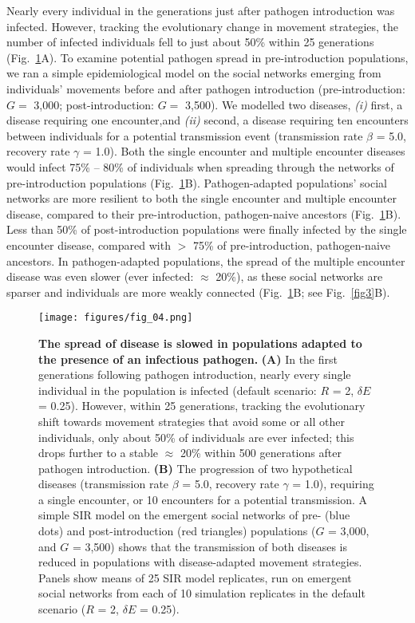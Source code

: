 Nearly every individual in the generations just after pathogen introduction was infected.
However, tracking the evolutionary change in movement strategies, the number of infected individuals fell to just about 50\% within 25 generations (Fig.~\ref{fig4}A).
To examine potential pathogen spread in pre-introduction populations, we ran a simple epidemiological model on the social networks emerging from individuals' movements before and after pathogen introduction (pre-introduction: $G =$ 3,000; post-introduction: $G =$ 3,500).
We modelled two diseases, \textit{(i)} first, a disease requiring one encounter,and \textit{(ii)} second, a disease requiring ten encounters between individuals for a potential transmission event (transmission rate $\beta$ = 5.0, recovery rate $\gamma$ = 1.0).
Both the single encounter and multiple encounter diseases would infect 75\% -- 80\% of individuals when spreading through the networks of pre-introduction populations (Fig.~\ref{fig4}B).
Pathogen-adapted populations' social networks are more resilient to both the single encounter and multiple encounter disease, compared to their pre-introduction, pathogen-naive ancestors (Fig.~\ref{fig4}B).
Less than 50\% of post-introduction populations were finally infected by the single encounter disease, compared with $>$ 75\% of pre-introduction, pathogen-naive ancestors.
In pathogen-adapted populations, the spread of the multiple encounter disease was even slower (ever infected: $\approx$ 20\%), as these social networks are sparser and individuals are more weakly connected (Fig.~\ref{fig4}B; see Fig.~\ref{fig3}B).

\begin{figure}[!h]
    \centering
    \texttt{[image: figures/fig\_04.png]}
    \caption{
        \textbf{The spread of disease is slowed in populations adapted to the presence of an infectious pathogen.}
        \textbf{(A)} In the first generations following pathogen introduction, nearly every single individual in the population is infected (default scenario: $R$ = 2, $\delta E$ = 0.25).
        However, within 25 generations, tracking the evolutionary shift towards movement strategies that avoid some or all other individuals, only about 50\% of individuals are ever infected; this drops further to a stable $\approx$ 20\% within 500 generations after pathogen introduction.
        \textbf{(B)} The progression of two hypothetical diseases (transmission rate $\beta$ = 5.0, recovery rate $\gamma$ = 1.0), requiring  a single encounter, or 10 encounters for a potential transmission.
        A simple SIR model on the emergent social networks of pre- (blue dots) and post-introduction (red triangles) populations ($G$ = 3,000, and $G$ = 3,500) shows that the transmission of both diseases is reduced in populations with disease-adapted movement strategies.
        Panels show means of 25 SIR model replicates, run on emergent social networks from each of 10 simulation replicates in the default scenario ($R$ = 2, $\delta E$ = 0.25).
    }\label{fig4}
\end{figure}


